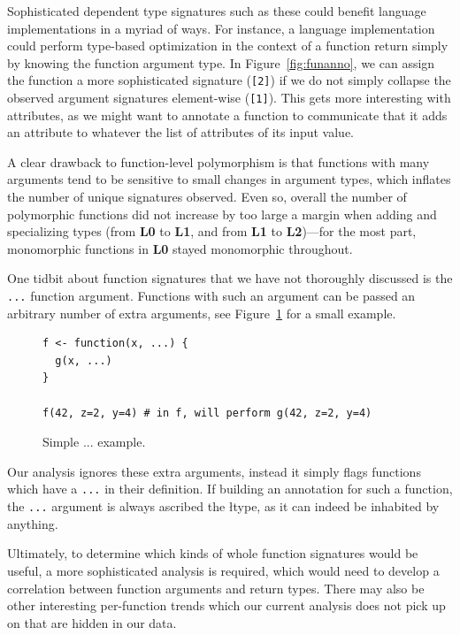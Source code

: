 \documentclass[acmsmall,10pt,review,anonymous]{acmart}\settopmatter{printfolios=true,printccs=false,printacmref=false}
\begin{document}
Sophisticated dependent type signatures such as these could benefit language implementations in a myriad of ways.
For instance, a language implementation could perform type-based optimization in the context of a function return simply by knowing the function argument type.
In Figure~\ref{fig:funanno}, we can assign the function a more sophisticated signature ({\tt [2]}) if we do not simply collapse the observed argument signatures element-wise ({\tt [1]}).
This gets more interesting with attributes, as we might want to annotate a function to communicate that it adds an attribute to whatever the list of attributes of its input value.

A clear drawback to function-level polymorphism is that functions with many arguments tend to be sensitive to small changes in argument types, which inflates the number of unique signatures observed.
Even so, overall the number of polymorphic functions did not increase by too large a margin when adding and specializing types (from {\bf L0} to {\bf L1}, and from {\bf L1} to {\bf L2})---for the most part, monomorphic functions in {\bf L0} stayed monomorphic throughout.

One tidbit about function signatures that we have not thoroughly discussed is the {\tt ...} function argument.
Functions with such an argument can be passed an arbitrary number of extra arguments, see Figure~\ref{fig:dotdotdot} for a small example.

\begin{figure}[!hb]{\small\begin{lstlisting}[style=R]
f <- function(x, ...) {
  g(x, ...)
}

f(42, z=2, y=4) # in f, will perform g(42, z=2, y=4)

\end{lstlisting}}\caption{Simple ... example.}\label{fig:dotdotdot}\end{figure}

Our analysis ignores these extra arguments, instead it simply flags functions which have a {\tt ...} in their definition.
If building an annotation for such a function, the {\tt ...} argument is always ascribed the \l type, as it can indeed be inhabited by anything.

Ultimately, to determine which kinds of whole function signatures would be useful, a more sophisticated analysis is required, which would need to develop a correlation between function arguments and return types.
There may also be other interesting per-function trends which our current analysis does not pick up on that are hidden in our data.
\end{document}
